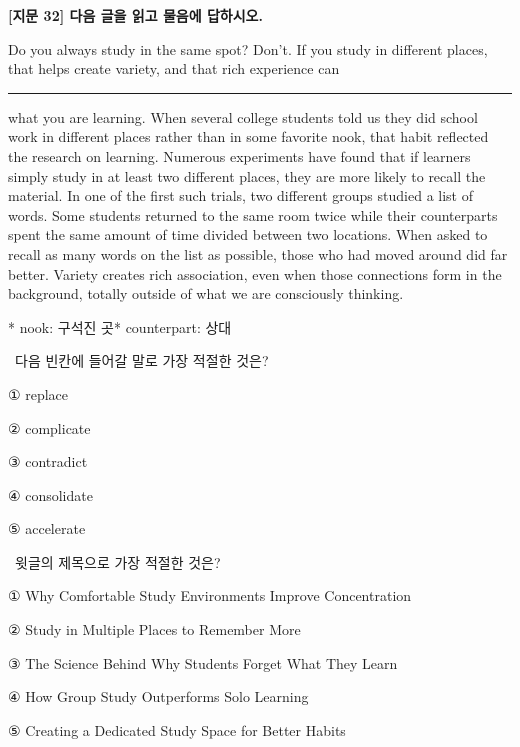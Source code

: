 \documentclass[11pt,a4paper]{article}
\newcommand{\qno}[1]{\par\vspace{8pt}\noindent{\sffamily\bfseries #1.}\ }
\newcommand{\instr}[1]{{\sffamily #1}\par\vspace{3pt}}
\begin{document}
\begin{center}
{\fontsize{15}{17}\selectfont\sffamily\bfseries [지문 32] 다음 글을 읽고 물음에 답하시오.}
\end{center}
\vspace{4pt}

\begin{pbox}
Do you always study in the same spot? Don't. If you study in different places,
that helps create variety, and that rich experience can \rule{3cm}{0.4pt} what
you are learning. When several college students told us they did school work in
different places rather than in some favorite nook, that habit reflected the
research on learning. Numerous experiments have found that if learners simply
study in at least two different places, they are more likely to recall the
material. In one of the first such trials, two different groups studied a list
of words. Some students returned to the same room twice while their counterparts
spent the same amount of time divided between two locations. When asked to recall
as many words on the list as possible, those who had moved around did far better.
Variety creates rich association, even when those connections form in the
background, totally outside of what we are consciously thinking.

\medskip
\footnotesize
* nook: 구석진 곳\quad ** counterpart: 상대
\end{pbox}

\bigskip

\qno{1}\instr{다음 빈칸에 들어갈 말로 가장 적절한 것은?}
\begin{choices}
\item ① replace
\item ② complicate
\item ③ contradict
\item ④ consolidate
\item ⑤ accelerate
\end{choices}

\qno{2}\instr{윗글의 제목으로 가장 적절한 것은?}
\begin{choices}
\item ① Why Comfortable Study Environments Improve Concentration
\item ② Study in Multiple Places to Remember More
\item ③ The Science Behind Why Students Forget What They Learn
\item ④ How Group Study Outperforms Solo Learning
\item ⑤ Creating a Dedicated Study Space for Better Habits
\end{choices}
\end{document}
